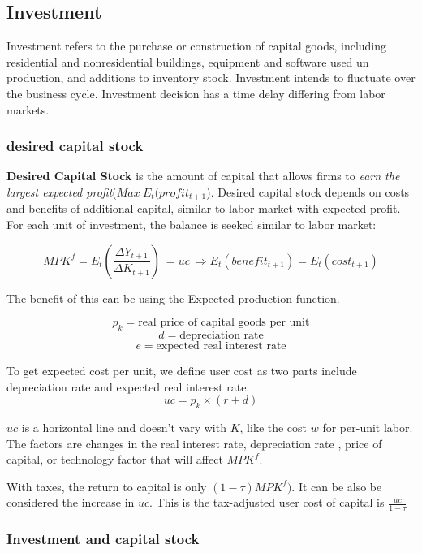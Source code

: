 \documentclass[10pt, a4paper]{article}
\begin{document}
        \subsection{Investment}
            Investment refers to the purchase or construction of capital goods, including residential and nonresidential buildings, equipment and software used un production, and additions to inventory stock. Investment intends to fluctuate over the business cycle. Investment decision has a time delay differing from labor markets. 
            \subsubsection{desired capital stock}
                \textbf{Desired Capital Stock} is the amount of capital that allows firms to \emph{earn the largest expected profit}($Max\ E_t(profit_{t+1}$). Desired capital stock depends on costs and benefits of additional capital, similar to labor market with expected profit. For each unit of investment, the balance is seeked similar to labor market: 

                $$MPK^f = E_t(\frac{\Delta Y_{t+1}}{\Delta K_{t+1}})\  = uc\  \Rightarrow E_t(benefit_{t+1}) = E_t(cost_{t+1})$$

                The benefit of this can be using the Expected production function.

                $$p_k = \text{real\ price\ of\ capital\ goods\ per\ unit}$$
                $$d = \text{depreciation\ rate}$$
                $$e = \text{expected\ real\ interest\ rate}$$

                To get expected cost per unit, we define user cost as two parts include depreciation rate and expected real interest rate:
                $$uc = p_k \times (r + d)$$

                $uc$ is a horizontal line and doesn't vary with $K$, like the cost $w$ for per-unit labor. The factors are changes in the real interest rate, depreciation rate , price of capital, or technology factor that will affect $MPK^f$.

                With taxes, the return to capital is only $(1 - \tau)MPK^f)$. It can be also be considered the increase in $uc$. This is the tax-adjusted user cost of capital is $\frac{uc}{1 - \tau}$
            \subsubsection{Investment and capital stock }
                
\end{document}
